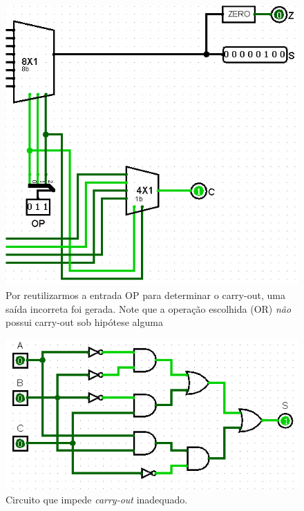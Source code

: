 \documentclass[
	12pt,				%
	openright,			%
	twoside,			%
	a4paper,			%
	english,			%
	french,				%
	spanish,			%
	brazil,				%
	]{abntex2}
\begin{document}
\begin{figure}[H]
	\begin{center}
	    \includegraphics[scale=0.5]{carryoutincorreto.png}
	\end{center}
\caption{\label{carryoutincorreto}Por reutilizarmos a entrada OP para determinar o carry-out, uma saída incorreta foi gerada. Note que a operação escolhida (OR) \textit{não} possui carry-out sob hipótese alguma}
\end{figure}

\begin{figure}[H]
	\begin{center}
	    \includegraphics[scale=0.5]{validacout.png}
	\end{center}
\caption{\label{validacout}Circuito que impede \textit{carry-out} inadequado.}
\end{figure}
\end{document}
